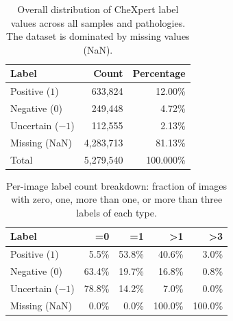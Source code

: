 \documentclass[10pt,twocolumn,letterpaper]{article}
\begin{document}
\begin{table}[ht]
\centering
\caption{Overall distribution of CheXpert label values across all samples and pathologies. The dataset is dominated by missing values (NaN).}
\label{tab:overall_label_distribution}
\begin{tabular}{lrr}
\hline
\textbf{Label} & \textbf{Count} & \textbf{Percentage} \\
\hline
Positive ($1$)   & 633,824   & 12.00\% \\
Negative ($0$)   & 249,448   & 4.72\% \\
Uncertain ($-1$) & 112,555   & 2.13\% \\
Missing (NaN)    & 4,283,713 & 81.13\% \\
\hline
Total            & 5,279,540 & 100.000\% \\
\hline
\end{tabular}
\end{table}

\begin{table}[ht]
\centering
\caption{Per-image label count breakdown: fraction of images with zero, one, more than one, or more than three labels of each type.}
\label{tab:per_row_breakdown}
\begin{tabular}{lrrrr}
\hline
\textbf{Label} & \textbf{=0} & \textbf{=1} & \textbf{>1} & \textbf{>3} \\
\hline
Positive ($1$)   & 5.5\%  & 53.8\% & 40.6\% & 3.0\% \\
Negative ($0$)   & 63.4\% & 19.7\% & 16.8\% & 0.8\% \\
Uncertain ($-1$) & 78.8\% & 14.2\% & 7.0\%  & 0.0\% \\
Missing (NaN)    & 0.0\%  & 0.0\%  & 100.0\% & 100.0\% \\
\hline
\end{tabular}
\end{table}

\end{document}
